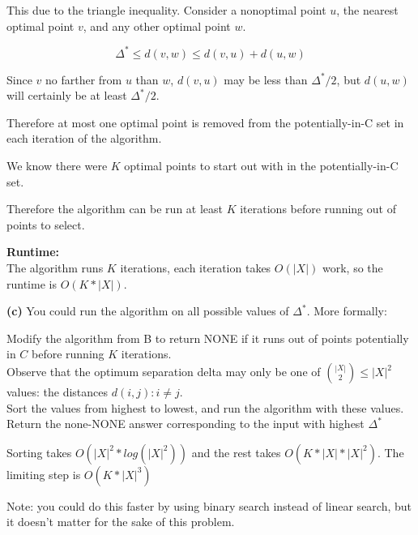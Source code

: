 \documentclass[11pt]{article}
\renewcommand{\part}[1] {\vspace{.10in} {\bf (#1)}}
\begin{document}
This due to the triangle inequality. Consider a nonoptimal point $u$, the nearest optimal point $v$, and any other optimal point $w$.

$$\Delta^{*} \leq d(v,w) \leq d(v,u) + d(u,w)$$

Since $v$ no farther from  $u$ than $w$, $d(v,u)$ may be less than $\Delta^{*} / 2$, but $d(u,w)$ will certainly be at least $\Delta^{*} / 2$.

Therefore at most one optimal point is removed from the potentially-in-C set in each iteration of the algorithm.

We know there were $K$ optimal points to start out with in the potentially-in-C set.

Therefore the algorithm can be run at least $K$ iterations before running out of points to select.

\textbf{Runtime:}\\
The algorithm runs $K$ iterations, each iteration takes $O(|X|)$ work, so the runtime is $O(K*|X|)$.

\part{c}
You could run the algorithm on all possible values of $\Delta^{*}$. More formally:

Modify the algorithm from B to return NONE if it runs out of points potentially in $C$ before running $K$ iterations.\\
Observe that the optimum separation delta may only be one of $\binom{|X|}{2} \leq |X|^2$ values: the distances $d(i,j) : i \neq j$.\\
Sort the values from highest to lowest, and run the algorithm with these values.\\
Return the none-NONE answer corresponding to the input with highest $\Delta^{*}$

Sorting takes $O(|X|^{2} * log(|X|^2))$ and the rest takes $O(K*|X|*|X|^2)$. The limiting step is $O(K*|X|^3)$

Note: you could do this faster by using binary search instead of linear search, but it doesn't matter for the sake of this problem.
\end{document}
